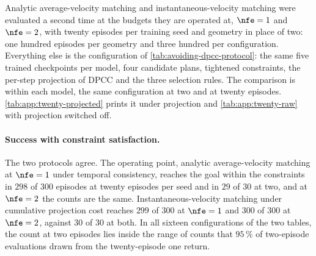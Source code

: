 Analytic average-velocity matching and instantaneous-velocity matching were evaluated a second time at
the budgets they are operated at, $\nfe=1$ and $\nfe=2$, with twenty episodes per training seed and
geometry in place of two: one hundred episodes per geometry and three hundred per configuration.
Everything else is the configuration of \autoref{tab:avoiding-dpcc-protocol}: the same five trained
checkpoints per model, four candidate plans, tightened constraints, the per-step projection of \ac{DPCC}
and the three selection rules. The comparison is within each model, the same configuration at two and at
twenty episodes. \autoref{tab:app:twenty-projected} prints it under projection and
\autoref{tab:app:twenty-raw} with projection switched off.

\paragraph{Success with constraint satisfaction.}
The two protocols agree. The operating point, analytic average-velocity matching at $\nfe=1$ under temporal
consistency, reaches the goal within the constraints in $298$ of $300$ episodes at twenty episodes per seed
and in $29$ of $30$ at two, and at $\nfe=2$ the counts are the same. Instantaneous-velocity matching under
cumulative projection cost reaches $299$ of $300$ at $\nfe=1$ and $300$ of $300$ at $\nfe=2$, against
$30$ of $30$ at both. In all sixteen configurations of the two tables, the count at two episodes lies
inside the range of counts that $95\,\%$ of two-episode evaluations drawn from the twenty-episode one
return.

